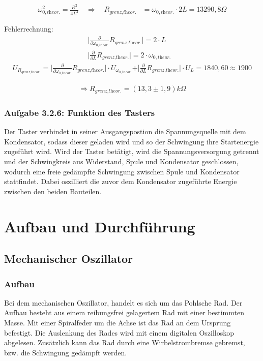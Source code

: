 \documentclass[a4paper]{scrartcl}
\numberwithin{equation}{subsection}
\begin{document}
\begin{align}
\omega_{0,\textit{theor.}}^2 = \frac{R^2}{4L^2} \quad \Rightarrow \quad R_{\textit{grenz,theor.}} &= \omega_{0,\textit{theor.}} \cdot 2L = 13290,8 \Omega
\end{align}


Fehlerrechnung:
\begin{align*}
\vert \frac{\partial}{\partial \omega_{0,\textit{theor.}}}R_{\textit{grenz,theor.}}\vert = 2 \cdot L &\\
\vert \frac{\partial}{\partial L}R_{\textit{grenz,theor.}}\vert = 2 \cdot \omega_{0,\textit{theor.}} &
\end{align*}
\begin{align*}
U_{R_{\textit{grenz,theor.}}} = \vert \frac{\partial}{\partial \omega_{0,\textit{theor.}}}R_{\textit{grenz,theor.}}\vert \cdot U_{\omega_{0,\textit{theor.}}} + \vert \frac{\partial}{\partial L}R_{\textit{grenz,theor.}}\vert \cdot U_L = 1840,60 \approx 1900 
\end{align*}

\begin{align*}
\Rightarrow R_{\textit{grenz,theor.}} = (13,3 \pm 1,9) k \Omega
\end{align*}

\subsubsection{Aufgabe 3.2.6: Funktion des Tasters}
Der Taster verbindet in seiner Ausgangspostion die Spannungsquelle mit dem Kondensator, sodass dieser geladen wird und so der Schwingung ihre Startenergie zugeführt wird. Wird der Taster betätigt, wird die Spannungsversorgung getrennt und der Schwingkreis aus Widerstand, Spule und Kondensator geschlossen, wodurch eine freie gedämpfte Schwingung zwischen Spule und Kondensator stattfindet. Dabei oszilliert die zuvor dem Kondensator zugeführte Energie zwischen den beiden Bauteilen.

\newpage

\section{Aufbau und Durchführung}
\subsection{Mechanischer Oszillator}
\subsubsection{Aufbau}
Bei dem mechanischen Oszillator, handelt es sich um das Pohlsche Rad.
Der Aufbau besteht aus einem reibungsfrei gelagertem Rad mit einer bestimmten Masse.
Mit einer Spiralfeder um die Achse ist das Rad an dem Ursprung befestigt.
Die Auslenkung des Rades wird mit einem digitalen Oszilloskop abgelesen.
Zusätzlich kann das Rad durch eine Wirbelstrombremse gebremst, bzw. die Schwingung gedämpft werden.
\end{document}
